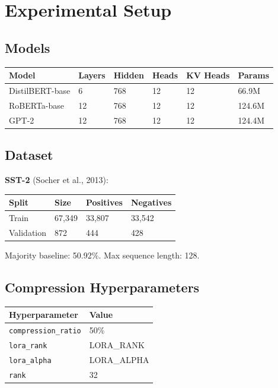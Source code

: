 \section{Experimental Setup}

\subsection{Models}

\begin{table}[H]
\centering
\small
\begin{tabular}{llllll}
\toprule
\textbf{Model} & \textbf{Layers} & \textbf{Hidden} & \textbf{Heads} & \textbf{KV Heads} & \textbf{Params} \\
\midrule
DistilBERT-base & 6 & 768 & 12 & 12 & 66.9M \\
RoBERTa-base & 12 & 768 & 12 & 12 & 124.6M \\
GPT-2 & 12 & 768 & 12 & 12 & 124.4M \\
\bottomrule
\end{tabular}
\end{table}

\subsection{Dataset}

\textbf{SST-2} (Socher et al., 2013):

\begin{table}[H]
\centering
\small
\begin{tabular}{llll}
\toprule
\textbf{Split} & \textbf{Size} & \textbf{Positives} & \textbf{Negatives} \\
\midrule
Train & 67,349 & 33,807 & 33,542 \\
Validation & 872 & 444 & 428 \\
\bottomrule
\end{tabular}
\end{table}

Majority baseline: 50.92\%. Max sequence length: 128.

\subsection{Compression Hyperparameters}

\begin{table}[H]
\centering
\small
\begin{tabular}{ll}
\toprule
\textbf{Hyperparameter} & \textbf{Value} \\
\midrule
\texttt{compression\_ratio} & 50\% \\
\texttt{lora\_rank} & {{LORA\_RANK}} \\
\texttt{lora\_alpha} & {{LORA\_ALPHA}} \\
\texttt{rank} & 32 \\
\bottomrule
\end{tabular}
\end{table}

